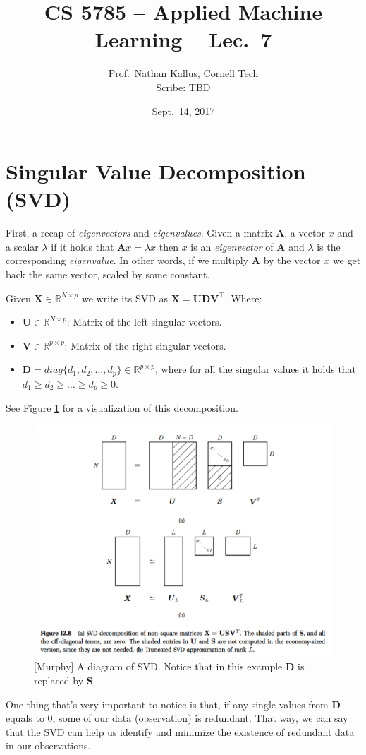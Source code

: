 \documentclass[a4paper]{article}
\title{CS 5785 -- Applied Machine Learning -- Lec.\ 7}
\author{Prof.\ Nathan Kallus, Cornell Tech\\Scribe: TBD}
\date{Sept.\ 14, 2017}
\begin{document}
\maketitle



\section{Singular Value Decomposition (SVD)}
First, a recap of \textit{eigenvectors} and \textit{eigenvalues}.
Given a matrix $\mathbf A$, a vector $x$ and a scalar $\lambda$ if it holds that ${\mathbf A}x=\lambda x$ then $x$ is an \textit{eigenvector} of ${\mathbf A}$ and $\lambda$ is the corresponding \textit{eigenvalue}.  In other words, if we multiply ${\mathbf A}$ by the vector $x$ we get back the same vector, scaled by some constant. 

Given ${\mathbf X}\in {\mathbb R}^{N\times p}$ we write its SVD as $\mathbf{X}=\mathbf{UD}\mathbf{V}^\top$. Where:
\begin{itemize}
\item ${\mathbf U}\in {\mathbb R}^{N\times p}$: Matrix of the left singular vectors.
\item ${\mathbf V}\in {\mathbb R}^{p\times p}$: Matrix of the right singular vectors.
\item ${\mathbf D}=diag\{d_1,d_2,\ldots, d_p\}\in {\mathbb R}^{p\times p}$, where for all the singular values it holds that $d_1\geq d_2\geq \ldots \geq d_p \geq 0$.
\end{itemize}
See Figure \ref{fig:SVDDiagram} for a visualization of this decomposition.

\begin{figure}
\centering
\includegraphics[width=1.0\textwidth]{SVD_diagram.png}
\caption{\label{fig:SVDDiagram} [Murphy] A diagram of SVD. Notice that in this example $\mathbf{D}$ is replaced by $\mathbf{S}$.}
\end{figure}
One thing that's very important to notice is that, if any single values from \textbf{D} equals to 0, some of our data (observation) is redundant. That way, we can say that the SVD can help us identify and minimize the existence of redundant data in our observations.
\end{document}
